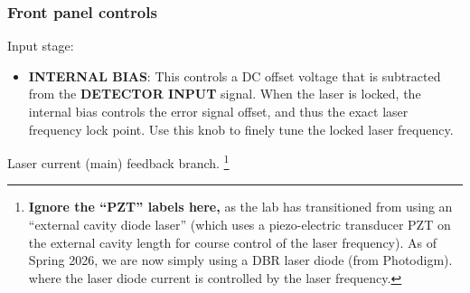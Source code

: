 \documentclass{../lab}
\begin{document}
\subsubsection{Front panel controls}

Input stage:

\begin{itemize}
    \item \textbf{INTERNAL BIAS}: This controls a DC offset voltage that is subtracted from the \textbf{DETECTOR INPUT} signal. When the laser is locked, the internal bias controls the error signal offset, and thus the exact laser frequency lock point. Use this knob to finely tune the locked laser frequency.
\end{itemize}

Laser current (main) feedback branch. \footnote{\textbf{Ignore the ``PZT'' labels here,} as the lab has transitioned from using an ``external cavity diode laser'' (which uses a piezo-electric transducer PZT on the external cavity length for course control of the laser frequency). As of Spring 2026, we are now simply using a DBR laser diode (from Photodigm). where the laser diode current is controlled by the laser frequency.}
\end{document}

